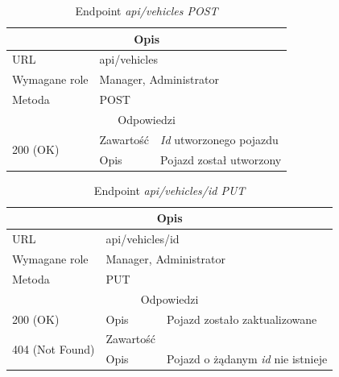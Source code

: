 \documentclass[eng,printmode,openany]{mgr}
\begin{document}
\begin{table}[H]
	\caption{Endpoint \textit{api/vehicles POST}}
	\begin{tabularx}{\textwidth}{|l|l|X|}
		\hline
		\multicolumn{3}{|c|}{Opis}
		\\ \hline
		URL                       & \multicolumn{2}{l|}{api/vehicles}
		\\ \hline
		Wymagane role             & \multicolumn{2}{l|}{Manager, Administrator}
		\\ \hline
		Metoda                    & \multicolumn{2}{l|}{POST}
		\\ \hline
		\multicolumn{3}{|c|}{Odpowiedzi}
		\\ \hline
		\multirow{2}{*}{200 (OK)} 		& Zawartość     & \textit{Id} utworzonego pojazdu
		\\ \cline{2-3}                  & Opis         	& Pojazd został utworzony
		\\ \hline
	\end{tabularx}
\end{table}

\begin{table}[H]
	\caption{Endpoint \textit{api/vehicles/id PUT}}
	\begin{tabularx}{\textwidth}{|l|l|X|}
		\hline
		\multicolumn{3}{|c|}{Opis}
		\\ \hline
		URL                       & \multicolumn{2}{l|}{api/vehicles/id}
		\\ \hline
		Wymagane role             & \multicolumn{2}{l|}{Manager, Administrator}
		\\ \hline
		Metoda                    & \multicolumn{2}{l|}{PUT}
		\\ \hline
		\multicolumn{3}{|c|}{Odpowiedzi}
		\\ \hline
		200 (OK) 		                        & Opis      	& Pojazd zostało zaktualizowane
		\\ \hline
		\multirow{2}{*}{404 (Not Found)} 	    & Zawartość     &   
		\\ \cline{2-3}                          & Opis          & Pojazd o żądanym \textit{id} nie istnieje
		\\ \hline
	\end{tabularx}
\end{table}
\end{document}
